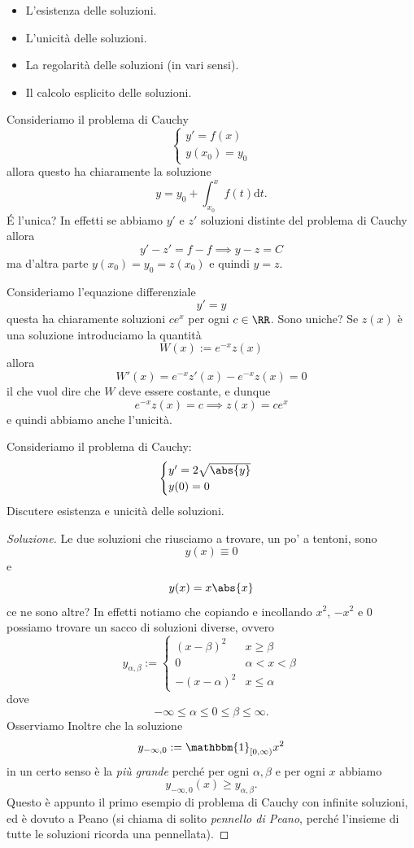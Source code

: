 \documentclass[11pt]{scrartcl}
\newcommand{\dif}{\text{d}}
\begin{document}
	\begin{itemize}
		\item L'esistenza delle soluzioni.
		\item L'unicità delle soluzioni.
		\item La regolarità delle soluzioni (in vari sensi).
		\item Il calcolo esplicito delle soluzioni. 
	\end{itemize}
	\begin{example}
		Consideriamo il problema di Cauchy
		$$
		\begin{cases}
			y'=f(x) \\
			y(x_0)=y_0
		\end{cases}
		$$
		allora questo ha chiaramente la soluzione
		$$y=y_0+\int_{x_0}^x f(t)\dif t.$$
		\'E l'unica? In effetti se abbiamo $y'$ e $z'$ soluzioni distinte del problema di Cauchy allora
		$$y'-z'=f-f \implies y-z=C$$
		ma d'altra parte $y(x_0)=y_0=z(x_0)$ e quindi $y=z$.
	\end{example}
	\begin{example}[Esponenziale]
		Consideriamo l'equazione differenziale
		$$y'=y$$
		questa ha chiaramente soluzioni $ce^x$ per ogni $c\in\RR$. Sono uniche? Se $z(x)$ è una soluzione introduciamo la quantità
		$$W(x):=e^{-x}z(x)$$
		allora 
		$$W'(x)=e^{-x}z'(x)-e^{-x}z(x)=0$$
		il che vuol dire che $W$ deve essere costante, e dunque  
		$$e^{-x}z(x)=c\implies z(x)=ce^{x}$$
		e quindi abbiamo anche l'unicità. 
	\end{example}
	\begin{example}
		Consideriamo il problema di Cauchy:
		$$
		\begin{cases}
			y'= 2\sqrt{\abs{y}} \\
			y(0)=0
		\end{cases}
		$$
		Discutere esistenza e unicità delle soluzioni.
		
	\end{example}
	\begin{proof}[Soluzione]
		Le due soluzioni che riusciamo a trovare, un po' a tentoni, sono 
		$$y(x)\equiv 0$$
		e 
		$$y(x)=x\abs{x}$$
		ce ne sono altre? In effetti notiamo che copiando e incollando $x^2$, $-x^2$ e $0$ possiamo trovare un sacco di soluzioni diverse, ovvero 
		$$y_{\alpha,\beta}:=
		\begin{cases}
			\left(x-\beta\right)^2 & x\ge \beta \\
			0 & \alpha < x < \beta \\
			-\left(x-\alpha\right)^2 & x \le \alpha
		\end{cases}
		$$
		dove 
		$$-\infty \le \alpha \le 0 \le \beta \le \infty.$$
		Osserviamo Inoltre che la soluzione
		$$y_{-\infty,0}:=\mathbbm{1}_{[0,\infty)}x^2$$
		in un certo senso è la \textit{più grande} perché per ogni $\alpha,\beta$ e per ogni $x$ abbiamo
		$$y_{-\infty,0}(x)\ge y_{\alpha,\beta}.$$
		Questo è appunto il primo esempio di problema di Cauchy con infinite soluzioni, ed è dovuto a Peano (si chiama di solito \textit{pennello di Peano}, perché l'insieme di tutte le soluzioni ricorda una pennellata).
	\end{proof}
	
\end{document}
